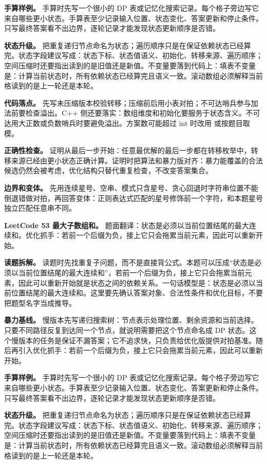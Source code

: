 \textbf{手算样例。} 手算时先写一个很小的 DP 表或记忆化搜索记录。每个格子旁边写它来自哪些更小状态。手算表至少记录输入位置、状态变化、答案更新和停止条件。只写最终答案看不出边界，逐轮记录才能发现状态更新顺序是否错。

\textbf{状态升级。} 把重复递归节点命名为状态；遍历顺序只是在保证依赖状态已经算完。状态字段建议写成：状态下标、状态值语义、初始化、转移来源、遍历顺序；空间压缩时还要指出读到的是旧值还是新值。不变量要落到代码上：填表不变量是：计算当前状态时，所有依赖状态已经算完且语义一致。滚动数组必须解释当前格读到的是上一轮还是本轮。

\textbf{代码落点。} 先写未压缩版本校验转移；压缩前后用小表对拍；不可达哨兵参与加法前要检查溢出。C++ 侧还要落实：数组维度和初始化要服务于状态含义。不可达用大正数或负数哨兵时要避免溢出。方案数可能超过 int 时改用  或按题目取模。

\textbf{正确性检查。} 证明从最后一步开始：任意最优解的最后一步都在转移枚举中，转移来源已经由更小状态正确计算。证明时把算法和暴力版对齐：暴力能覆盖的合法候选仍然会被考虑，优化结构只替代重复检查，不改变答案集合。

\textbf{边界和变体。} 先用连续星号、空串、模式只含星号、贪心回退时字符串位置不能倒退错做对拍，再回答变体：正则表达式匹配的星号修饰前一个字符，和本题星号独立匹配任意串不同。

\noindent\textbf{LeetCode 53 最大子数组和。} 题面翻译：状态是必须以当前位置结尾的最大连续和。优化抓手：若前一个后缀为负，接上它只会拖累当前元素，因此可以重新开始。

\textbf{读题拆解。} 读题时先找重复子问题，而不是直接背公式。本题可以压成“状态是必须以当前位置结尾的最大连续和”，若前一个后缀为负，接上它只会拖累当前元素，因此可以重新开始就是状态之间的依赖关系。一句话模型是：状态是必须以当前位置结尾的最大连续和。这里要先确认答案对象、合法性条件和优化目标，不要把题型名字当成推导。

\textbf{暴力基线。} 慢版本先写递归搜索树：节点表示处理位置、剩余资源和当前选择。只要不同路径反复到达同一个节点，就说明需要把这个节点命名成 DP 状态。这个慢版本的任务是保证不漏答案；它不追求快，只负责给优化版提供对拍基准。随后再引入优化抓手：若前一个后缀为负，接上它只会拖累当前元素，因此可以重新开始。

\textbf{手算样例。} 手算时先写一个很小的 DP 表或记忆化搜索记录。每个格子旁边写它来自哪些更小状态。手算表至少记录输入位置、状态变化、答案更新和停止条件。只写最终答案看不出边界，逐轮记录才能发现状态更新顺序是否错。

\textbf{状态升级。} 把重复递归节点命名为状态；遍历顺序只是在保证依赖状态已经算完。状态字段建议写成：状态下标、状态值语义、初始化、转移来源、遍历顺序；空间压缩时还要指出读到的是旧值还是新值。不变量要落到代码上：填表不变量是：计算当前状态时，所有依赖状态已经算完且语义一致。滚动数组必须解释当前格读到的是上一轮还是本轮。

